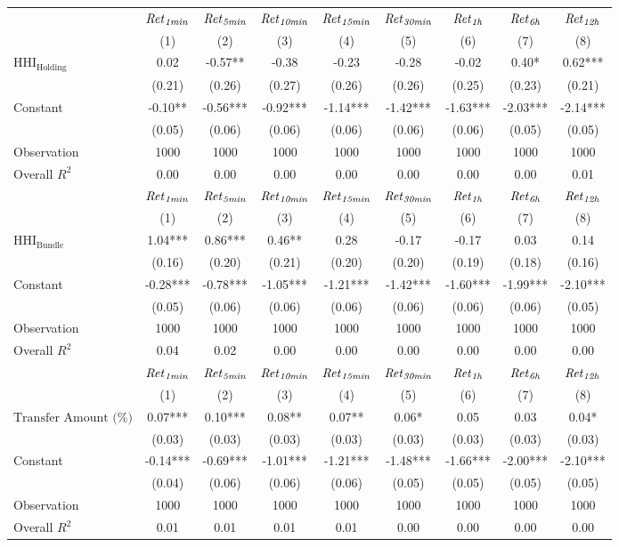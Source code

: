 \begin{tabular}{lcccccccc}
\hline
 & ${\it Ret}_{\it 1min}$ & ${\it Ret}_{\it 5min}$ & ${\it Ret}_{\it 10min}$ & ${\it Ret}_{\it 15min}$ & ${\it Ret}_{\it 30min}$ & ${\it Ret}_{\it 1h}$ & ${\it Ret}_{\it 6h}$ & ${\it Ret}_{\it 12h}$ \\
 & (1) & (2) & (3) & (4) & (5) & (6) & (7) & (8) \\
\hline
$\text{HHI}_{\text{Holding}}$ & 0.02 & -0.57** & -0.38 & -0.23 & -0.28 & -0.02 & 0.40* & 0.62*** \\
 & (0.21) & (0.26) & (0.27) & (0.26) & (0.26) & (0.25) & (0.23) & (0.21) \\
Constant & -0.10** & -0.56*** & -0.92*** & -1.14*** & -1.42*** & -1.63*** & -2.03*** & -2.14*** \\
 & (0.05) & (0.06) & (0.06) & (0.06) & (0.06) & (0.06) & (0.05) & (0.05) \\
Observation & 1000 & 1000 & 1000 & 1000 & 1000 & 1000 & 1000 & 1000 \\
Overall $R^2$ & 0.00 & 0.00 & 0.00 & 0.00 & 0.00 & 0.00 & 0.00 & 0.01 \\
\hline
 & ${\it Ret}_{\it 1min}$ & ${\it Ret}_{\it 5min}$ & ${\it Ret}_{\it 10min}$ & ${\it Ret}_{\it 15min}$ & ${\it Ret}_{\it 30min}$ & ${\it Ret}_{\it 1h}$ & ${\it Ret}_{\it 6h}$ & ${\it Ret}_{\it 12h}$ \\
 & (1) & (2) & (3) & (4) & (5) & (6) & (7) & (8) \\
\hline
$\text{HHI}_{\text{Bundle}}$ & 1.04*** & 0.86*** & 0.46** & 0.28 & -0.17 & -0.17 & 0.03 & 0.14 \\
 & (0.16) & (0.20) & (0.21) & (0.20) & (0.20) & (0.19) & (0.18) & (0.16) \\
Constant & -0.28*** & -0.78*** & -1.05*** & -1.21*** & -1.42*** & -1.60*** & -1.99*** & -2.10*** \\
 & (0.05) & (0.06) & (0.06) & (0.06) & (0.06) & (0.06) & (0.06) & (0.05) \\
Observation & 1000 & 1000 & 1000 & 1000 & 1000 & 1000 & 1000 & 1000 \\
Overall $R^2$ & 0.04 & 0.02 & 0.00 & 0.00 & 0.00 & 0.00 & 0.00 & 0.00 \\
\hline
 & ${\it Ret}_{\it 1min}$ & ${\it Ret}_{\it 5min}$ & ${\it Ret}_{\it 10min}$ & ${\it Ret}_{\it 15min}$ & ${\it Ret}_{\it 30min}$ & ${\it Ret}_{\it 1h}$ & ${\it Ret}_{\it 6h}$ & ${\it Ret}_{\it 12h}$ \\
 & (1) & (2) & (3) & (4) & (5) & (6) & (7) & (8) \\
\hline
$\text{Transfer Amount (\%)}$ & 0.07*** & 0.10*** & 0.08** & 0.07** & 0.06* & 0.05 & 0.03 & 0.04* \\
 & (0.03) & (0.03) & (0.03) & (0.03) & (0.03) & (0.03) & (0.03) & (0.03) \\
Constant & -0.14*** & -0.69*** & -1.01*** & -1.21*** & -1.48*** & -1.66*** & -2.00*** & -2.10*** \\
 & (0.04) & (0.06) & (0.06) & (0.06) & (0.05) & (0.05) & (0.05) & (0.05) \\
Observation & 1000 & 1000 & 1000 & 1000 & 1000 & 1000 & 1000 & 1000 \\
Overall $R^2$ & 0.01 & 0.01 & 0.01 & 0.01 & 0.00 & 0.00 & 0.00 & 0.00 \\
\hline
\end{tabular}
